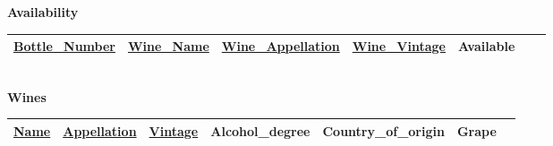 \documentclass{article}
\theoremstyle{remark}
\numberwithin{equation}{section}
\begin{document}
\textbf{Availability}\\

\begin{tabular}{|l|l|l|l|l|l|l|}
	\hline
	\underline{Bottle\_Number} & \underline{Wine\_Name} & \underline{ Wine\_Appellation} & \underline{Wine\_Vintage} & Available \\ \hline
\end{tabular}\\

\textbf{Wines}\\

\begin{tabular}{|l|l|l|l|l|l|l|}
	\hline
	\underline{Name} & \underline{Appellation} & \underline{Vintage} & Alcohol\_degree & Country\_of\_origin & Grape \\ \hline
\end{tabular}\\





	  
	  
	  
	
	
\end{document}
